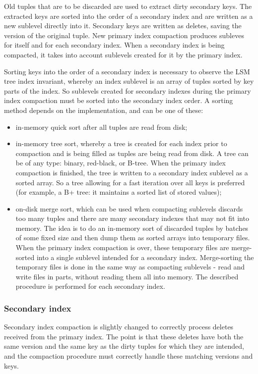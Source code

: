 \documentclass{vldb}
\begin{document}
Old tuples that are to be discarded are used to extract dirty secondary keys.
The extracted keys are sorted into the order of a secondary index and are written as
a new sublevel directly into it. Secondary keys are written as deletes, saving the
version of the original tuple. New primary index compaction produces subleves for
itself and for each secondary index. When a secondary index is being compacted, it takes
into account sublevels created for it by the primary index.

Sorting keys into the order of a secondary index is necessary to observe the LSM tree
index invariant, whereby an index sublevel is an array of tuples sorted by key
parts of the index. So sublevels created for secondary indexes during the primary
index compaction must be sorted into the secondary index order. A sorting method
depends on the implementation, and can be one of these:
\begin{itemize}
\item in-memory quick sort after all tuples are read from disk;
\item in-memory tree sort, whereby a tree is created for each index prior to
compaction and is being filled as tuples are being read from disk. A tree can be of
any type: binary, red-black, or B-tree. When the primary index compaction is finished, the
tree is written to a secondary index sublevel as a sorted array. So a tree allowing for a fast
iteration over all keys is preferred (for example, a B+ tree: it maintains a sorted list
of stored values);
\item on-disk merge sort, which can be used when compacting sublevels discards too
many tuples and there are many secondary indexes that may not fit into memory.
The idea is to do an in-memory sort of discarded tuples by batches of some fixed
size and then dump them as sorted arrays into temporary files. When the primary index
compaction is over, these temporary files are merge-sorted into a single sublevel
intended for a secondary index. Merge-sorting the temporary files is done in the same
way as compacting sublevels - read and write files in parts, without reading them all
into memory. The described procedure is performed for each secondary index.
\end{itemize}

\subsubsection{Secondary index}

Secondary index compaction is slightly changed to correctly process deletes received
from the primary index. The point is that these deletes have both the same version and
the same key as the dirty tuples for which they are intended, and the compaction
procedure must correctly handle these matching versions and keys.
\end{document}
